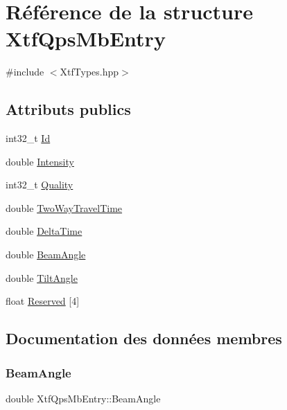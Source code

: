 \hypertarget{structXtfQpsMbEntry}{}\section{Référence de la structure Xtf\+Qps\+Mb\+Entry}
\label{structXtfQpsMbEntry}


{\ttfamily \#include $<$Xtf\+Types.\+hpp$>$}

\subsection*{Attributs publics}
\begin{DoxyCompactItemize}
\item 
int32\+\_\+t \hyperlink{structXtfQpsMbEntry_a854148f593a44f65c97a10dc73dd8fd4}{Id}
\item 
double \hyperlink{structXtfQpsMbEntry_a84ed6b835bbd21323ad9b34a9b9da483}{Intensity}
\item 
int32\+\_\+t \hyperlink{structXtfQpsMbEntry_a96ea7266157f22fe44889ae8c4563086}{Quality}
\item 
double \hyperlink{structXtfQpsMbEntry_afdb87508cd60aab93f94ff5bebce8ae8}{Two\+Way\+Travel\+Time}
\item 
double \hyperlink{structXtfQpsMbEntry_ae1d968e88095d95faa28bf05c93c8a3f}{Delta\+Time}
\item 
double \hyperlink{structXtfQpsMbEntry_a0729a05aee4c2a620f910561cd589fe9}{Beam\+Angle}
\item 
double \hyperlink{structXtfQpsMbEntry_ab6d0bf444edd6e75200008415a00120c}{Tilt\+Angle}
\item 
float \hyperlink{structXtfQpsMbEntry_a47b10e49052e388fd9820a8433ae3be1}{Reserved} \mbox{[}4\mbox{]}
\end{DoxyCompactItemize}


\subsection{Documentation des données membres}
\mbox{\label{structXtfQpsMbEntry_a0729a05aee4c2a620f910561cd589fe9}} 
\subsubsection{\texorpdfstring{Beam\+Angle}{BeamAngle}}
{\footnotesize\ttfamily double Xtf\+Qps\+Mb\+Entry\+::\+Beam\+Angle}

